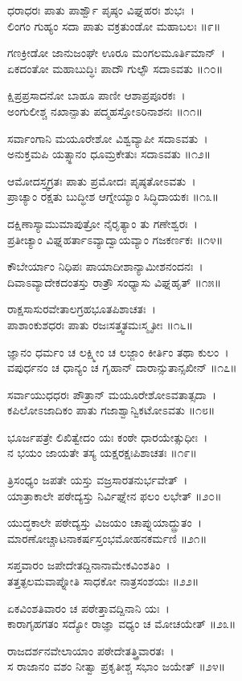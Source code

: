 ಧರಾಧರಃ ಪಾತು ಪಾರ್ಶ್ವೌ ಪೃಷ್ಠಂ ವಿಘ್ನಹರಃ ಶುಭಃ~।\\
ಲಿಂಗಂ ಗುಹ್ಯಂ ಸದಾ ಪಾತು ವಕ್ರತುಂಡೋ ಮಹಾಬಲಃ ॥೯॥

ಗಣಕ್ರೀಡೋ ಜಾನುಜಂಘೇ ಊರೂ ಮಂಗಲಮೂರ್ತಿಮಾನ್~।\\
ಏಕದಂತೋ ಮಹಾಬುದ್ಧಿಃ ಪಾದೌ ಗುಲ್ಫೌ ಸದಾಽವತು ॥೧೦॥

ಕ್ಷಿಪ್ರಪ್ರಸಾದನೋ ಬಾಹೂ ಪಾಣೀ ಆಶಾಪ್ರಪೂರಕಃ~।\\
ಅಂಗುಲೀಶ್ಚ ನಖಾನ್ಪಾತು ಪದ್ಮಹಸ್ತೋಽರಿನಾಶನಃ ॥೧೧॥

ಸರ್ವಾಂಗಾನಿ ಮಯೂರೇಶೋ ವಿಶ್ವವ್ಯಾಪೀ ಸದಾಽವತು~।\\
ಅನುಕ್ತಮಪಿ ಯತ್ಸ್ಥಾನಂ ಧೂಮ್ರಕೇತುಃ ಸದಾಽವತು ॥೧೨॥

ಆಮೋದಸ್ತ್ವಗ್ರತಃ ಪಾತು ಪ್ರಮೋದಃ ಪೃಷ್ಠತೋಽವತು~।\\
ಪ್ರಾಚ್ಯಾಂ ರಕ್ಷತು ಬುದ್ಧೀಶ ಆಗ್ನೇಯ್ಯಾಂ ಸಿದ್ಧಿದಾಯಕಃ ॥೧೩॥

ದಕ್ಷಿಣಾಸ್ಯಾಮುಮಾಪುತ್ರೋ ನೈರೃತ್ಯಾಂ ತು ಗಣೇಶ್ವರಃ~।\\
ಪ್ರತೀಚ್ಯಾಂ ವಿಘ್ನಹರ್ತಾಽವ್ಯಾದ್ವಾಯವ್ಯಾಂ ಗಜಕರ್ಣಕಃ ॥೧೪॥

ಕೌಬೇರ್ಯಾಂ ನಿಧಿಪಃ ಪಾಯಾದೀಶಾನ್ಯಾಮೀಶನಂದನಃ~।\\
ದಿವಾಽವ್ಯಾದೇಕದಂತಸ್ತು ರಾತ್ರೌ ಸಂಧ್ಯಾಸು ವಿಘ್ನಹೃತ್ ॥೧೫॥

ರಾಕ್ಷಸಾಸುರವೇತಾಲಗ್ರಹಭೂತಪಿಶಾಚತಃ~।\\
ಪಾಶಾಂಕುಶಧರಃ ಪಾತು ರಜಃಸತ್ತ್ವತಮಃಸ್ಮೃತೀಃ ॥೧೬॥

ಜ್ಞಾನಂ ಧರ್ಮಂ ಚ ಲಕ್ಷ್ಮೀಂ ಚ ಲಜ್ಜಾಂ ಕೀರ್ತಿಂ ತಥಾ ಕುಲಂ~।\\
ವಪುರ್ಧನಂ ಚ ಧಾನ್ಯಂ ಚ ಗೃಹಾನ್ ದಾರಾನ್ಸುತಾನ್ಸಖೀನ್ ॥೧೭॥

ಸರ್ವಾಯುಧಧರಃ ಪೌತ್ರಾನ್ ಮಯೂರೇಶೋಽವತಾತ್ಸದಾ~।\\
ಕಪಿಲೋಽಜಾದಿಕಂ ಪಾತು ಗಜಾಶ್ವಾನ್ವಿಕಟೋಽವತು ॥೧೮॥

ಭೂರ್ಜಪತ್ರೇ ಲಿಖಿತ್ವೇದಂ ಯಃ ಕಂಠೇ ಧಾರಯೇತ್ಸುಧೀಃ~।\\
ನ ಭಯಂ ಜಾಯತೇ ತಸ್ಯ ಯಕ್ಷರಕ್ಷಃಪಿಶಾಚತಃ ॥೧೯॥

ತ್ರಿಸಂಧ್ಯಂ ಜಪತೇ ಯಸ್ತು ವಜ್ರಸಾರತನುರ್ಭವೇತ್~।\\
ಯಾತ್ರಾಕಾಲೇ ಪಠೇದ್ಯಸ್ತು ನಿರ್ವಿಘ್ನೇನ ಫಲಂ ಲಭೇತ್ ॥೨೦॥

ಯುದ್ಧಕಾಲೇ ಪಠೇದ್ಯಸ್ತು ವಿಜಯಂ ಚಾಪ್ನುಯಾದ್ದ್ರುತಂ~।\\
ಮಾರಣೋಚ್ಚಾಟನಾಕರ್ಷಸ್ತಂಭಮೋಹನಕರ್ಮಣಿ ॥೨೧॥

ಸಪ್ತವಾರಂ ಜಪೇದೇತದ್ದಿನಾನಾಮೇಕವಿಂಶತಿಂ~।\\
ತತ್ತತ್ಫಲಮವಾಪ್ನೋತಿ ಸಾಧಕೋ ನಾತ್ರಸಂಶಯಃ ॥೨೨॥

ಏಕವಿಂಶತಿವಾರಂ ಚ ಪಠೇತ್ತಾವದ್ದಿನಾನಿ ಯಃ~।\\
ಕಾರಾಗೃಹಗತಂ ಸದ್ಯೋ ರಾಜ್ಞಾ ವಧ್ಯಂ ಚ ಮೋಚಯೇತ್ ॥೨೩॥

ರಾಜದರ್ಶನವೇಲಾಯಾಂ ಪಠೇದೇತತ್ತ್ರಿವಾರತಃ~।\\
ಸ ರಾಜಾನಂ ವಶಂ ನೀತ್ವಾ ಪ್ರಕೃತೀಶ್ಚ ಸಭಾಂ ಜಯೇತ್ ॥೨೪॥

